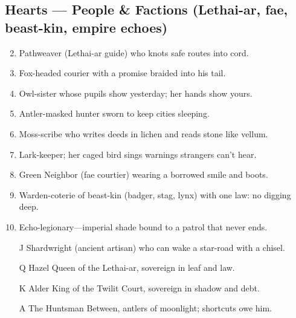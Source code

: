 \subsection*{Hearts --- People \& Factions (Lethai-ar, fae, beast-kin, empire echoes)}
\label{sec:valewood-people}
\begin{enumerate}
\setcounter{enumi}{1}
\item Pathweaver (Lethai-ar guide) who knots safe routes into cord.
\item Fox-headed courier with a promise braided into his tail.
\item Owl-sister whose pupils show yesterday; her hands show yours.
\item Antler-masked hunter sworn to keep cities sleeping.
\item Moss-scribe who writes deeds in lichen and reads stone like vellum.
\item Lark-keeper; her caged bird sings warnings strangers can't hear.
\item Green Neighbor (fae courtier) wearing a borrowed smile and boots.
\item Warden-coterie of beast-kin (badger, stag, lynx) with one law: no digging deep.
\item Echo-legionary---imperial shade bound to a patrol that never ends.
\item[J] Shardwright (ancient artisan) who can wake a star-road with a chisel.
\item[Q] Hazel Queen of the Lethai-ar, sovereign in leaf and law.
\item[K] Alder King of the Twilit Court, sovereign in shadow and debt.
\item[A] The Huntsman Between, antlers of moonlight; shortcuts owe him.
\end{enumerate}

